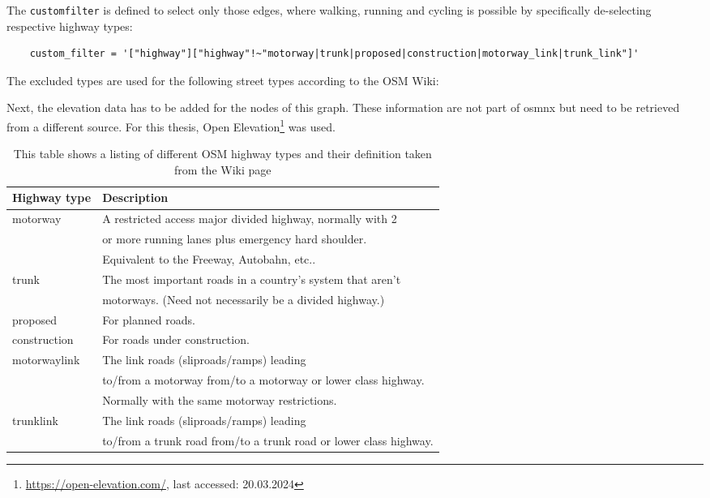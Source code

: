 The \texttt{custom\textunderscore filter} is defined to select only those edges, where walking, running and cycling is possible by specifically de-selecting respective highway types:

\begin{lstlisting}
	custom_filter = '["highway"]["highway"!~"motorway|trunk|proposed|construction|motorway_link|trunk_link"]'
\end{lstlisting}

The excluded types are used for the following street types according to the OSM Wiki:


Next, the elevation data has to be added for the nodes of this graph.
These information are not part of osmnx but need to be retrieved from a different source.
For this thesis, Open Elevation\footnote{\url{https://open-elevation.com/}, last accessed: 20.03.2024} was used.


\begin{table}[ht]
	\centering
	\begin{tabular}{l|l}
		Highway type & Description\\
		\hline
		motorway & A restricted access major divided highway, normally with 2\\ 
		& or more running lanes plus emergency hard shoulder.\\
		& Equivalent to the Freeway, Autobahn, etc..  \\
		trunk & The most important roads in a country's system that aren't \\
		& motorways. (Need not necessarily be a divided highway.) \\
		proposed & For planned roads. \\
		construction & For roads under construction. \\
		motorway\textunderscore link & The link roads (sliproads/ramps) leading\\
		& to/from a motorway from/to a motorway or lower class highway. \\
		& Normally with the same motorway restrictions. \\
		trunk\textunderscore link & The link roads (sliproads/ramps) leading \\
		& to/from a trunk road from/to a trunk road or lower class highway. 
	\end{tabular}
	\caption[OSM highway types]{This table shows a listing of different OSM highway types and their definition taken from the Wiki page\protect\footnotemark}
	\label{tab:osmHighwayTypes}
\end{table}


